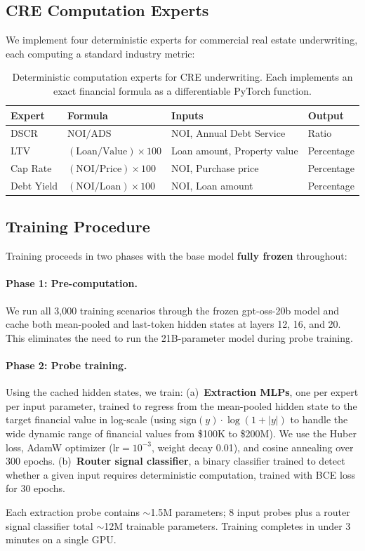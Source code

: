 \subsection{CRE Computation Experts}
\label{sec:method:cre}

We implement four deterministic experts for commercial real estate
underwriting, each computing a standard industry metric:

\begin{table}[h]
\centering
\small
\begin{tabular}{@{}llll@{}}
\toprule
\textbf{Expert} & \textbf{Formula} & \textbf{Inputs} & \textbf{Output} \\
\midrule
DSCR & $\text{NOI} / \text{ADS}$ & NOI, Annual Debt Service & Ratio \\
LTV & $(\text{Loan} / \text{Value}) \times 100$ & Loan amount, Property value & Percentage \\
Cap Rate & $(\text{NOI} / \text{Price}) \times 100$ & NOI, Purchase price & Percentage \\
Debt Yield & $(\text{NOI} / \text{Loan}) \times 100$ & NOI, Loan amount & Percentage \\
\bottomrule
\end{tabular}
\caption{Deterministic computation experts for CRE underwriting. Each
implements an exact financial formula as a differentiable PyTorch
function.}
\label{tab:experts}
\end{table}

\subsection{Training Procedure}
\label{sec:method:training}

Training proceeds in two phases with the base model \textbf{fully
frozen} throughout:

\paragraph{Phase 1: Pre-computation.}
We run all 3{,}000 training scenarios through the frozen gpt-oss-20b
model and cache both mean-pooled and last-token hidden states at layers
12, 16, and 20. This eliminates the need to run the 21B-parameter model
during probe training.

\paragraph{Phase 2: Probe training.}
Using the cached hidden states, we train:
(a)~\textbf{Extraction MLPs}, one per expert per input parameter,
trained to regress from the mean-pooled hidden state to the target
financial value in log-scale (using $\text{sign}(y) \cdot
\log(1 + |y|)$ to handle the wide dynamic range of financial values
from \$100K to \$200M). We use the Huber loss, AdamW optimizer
($\text{lr}{=}10^{-3}$, weight decay 0.01), and cosine annealing
over 300 epochs.
(b)~\textbf{Router signal classifier}, a binary classifier trained
to detect whether a given input requires deterministic computation,
trained with BCE loss for 30 epochs.

Each extraction probe contains ${\sim}$1.5M parameters; 8 input
probes plus a router signal classifier total ${\sim}$12M trainable
parameters. Training completes in under 3 minutes on a single GPU.
